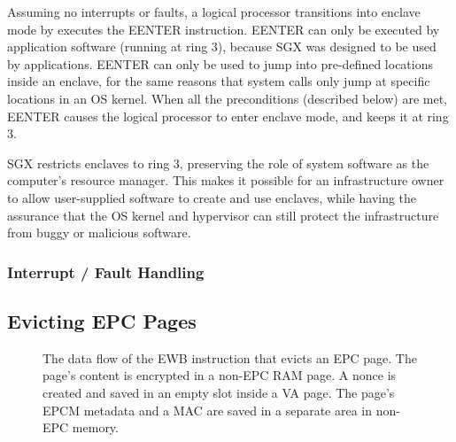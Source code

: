 Assuming no interrupts or faults, a logical processor transitions into enclave
mode by executes the EENTER instruction. EENTER can only be executed by
application software (running at ring 3), because SGX was designed to be used
by applications. EENTER can only be used to jump into pre-defined locations
inside an enclave, for the same reasons that system calls only jump at specific
locations in an OS kernel. When all the preconditions (described below) are
met, EENTER causes the logical processor to enter enclave mode, and keeps it at
ring 3.

SGX restricts enclaves to ring 3, preserving the role of system software as
the computer's resource manager. This makes it possible for an infrastructure
owner to allow user-supplied software to create and use enclaves, while having
the assurance that the OS kernel and hypervisor can still protect the
infrastructure from buggy or malicious software.


\subsubsection{Interrupt / Fault Handling}
\label{sec:aex}





\subsection{Evicting EPC Pages}
\label{sec:sgx_ewb}



\begin{figure}[hbt!]
  \caption{
    The data flow of the EWB instruction that evicts an EPC page. The page's
    content is encrypted in a non-EPC RAM page. A nonce is created and saved
    in an empty slot inside a VA page. The page's EPCM metadata and a MAC
    are saved in a separate area in non-EPC memory.
  }
  \label{fig:sgx_ewb}
\end{figure}


